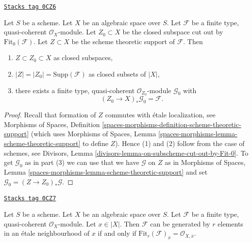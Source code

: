 \begin{lemma}
\label{spaces-divisors-lemma-on-subscheme-cut-out-by-Fit-0}
\href{https://stacks.math.columbia.edu/tag/0CZ6}{\texttt{Stacks tag 0CZ6}}

Let $S$ be a scheme. Let $X$ be an algebraic space over $S$.
Let $\mathcal{F}$ be a finite type, quasi-coherent $\mathcal{O}_X$-module.
Let $Z_0 \subset X$ be the closed subspace cut out by
$\text{Fit}_0(\mathcal{F})$.
Let $Z \subset X$ be the scheme theoretic support of $\mathcal{F}$.
Then
\begin{enumerate}
\item $Z \subset Z_0 \subset X$ as closed subspaces,
\item $|Z| = |Z_0| = \text{Supp}(\mathcal{F})$ as closed subsets of $|X|$,
\item there exists a finite type, quasi-coherent $\mathcal{O}_{Z_0}$-module
$\mathcal{G}_0$ with
$$
(Z_0 \to X)_*\mathcal{G}_0 = \mathcal{F}.
$$
\end{enumerate}
\end{lemma}

\begin{proof}
Recall that formation of $Z$ commutes with \'etale localization, see
Morphisms of Spaces, Definition
\ref{spaces-morphisms-definition-scheme-theoretic-support}
(which uses Morphisms of Spaces, Lemma
\ref{spaces-morphisms-lemma-scheme-theoretic-support}
to define $Z$). Hence (1) and (2) follow from the case of schemes, see
Divisors, Lemma \ref{divisors-lemma-on-subscheme-cut-out-by-Fit-0}.
To get $\mathcal{G}_0$ as in part (3) we can use
that we have $\mathcal{G}$ on $Z$ as in Morphisms of Spaces, Lemma
\ref{spaces-morphisms-lemma-scheme-theoretic-support}
and set $\mathcal{G}_0 = (Z \to Z_0)_*\mathcal{G}$.
\end{proof}

\begin{lemma}
\label{spaces-divisors-lemma-fitting-ideal-generate-locally}
\href{https://stacks.math.columbia.edu/tag/0CZ7}{\texttt{Stacks tag 0CZ7}}

Let $S$ be a scheme. Let $X$ be an algebraic space over $S$.
Let $\mathcal{F}$ be a finite type, quasi-coherent
$\mathcal{O}_X$-module. Let $x \in |X|$. Then $\mathcal{F}$ can be
generated by $r$ elements in an \'etale neighbourhood of $x$ if and only
if $\text{Fit}_r(\mathcal{F})_{\overline{x}} = \mathcal{O}_{X, \overline{x}}$.
\end{lemma}

